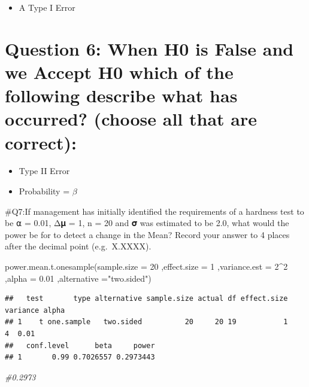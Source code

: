 \documentclass[
]{article}
\newenvironment{Shaded}{\begin{snugshade}}{\end{snugshade}}
\newcommand{\AttributeTok}[1]{\textcolor[rgb]{0.77,0.63,0.00}{#1}}
\newcommand{\CommentTok}[1]{\textcolor[rgb]{0.56,0.35,0.01}{\textit{#1}}}
\newcommand{\DecValTok}[1]{\textcolor[rgb]{0.00,0.00,0.81}{#1}}
\newcommand{\FloatTok}[1]{\textcolor[rgb]{0.00,0.00,0.81}{#1}}
\newcommand{\FunctionTok}[1]{\textcolor[rgb]{0.00,0.00,0.00}{#1}}
\newcommand{\NormalTok}[1]{#1}
\newcommand{\SpecialCharTok}[1]{\textcolor[rgb]{0.00,0.00,0.00}{#1}}
\newcommand{\StringTok}[1]{\textcolor[rgb]{0.31,0.60,0.02}{#1}}
\providecommand{\tightlist}{%
  \setlength{\itemsep}{0pt}\setlength{\parskip}{0pt}}
\begin{document}
\begin{itemize}
\tightlist
\item
  A Type I Error
\end{itemize}

\hypertarget{question-6-when-h0-is-false-and-we-accept-h0-which-of-the-following-describe-what-has-occurred-choose-all-that-are-correct}{%
\section{Question 6: When H0 is False and we Accept H0 which of the
following describe what has occurred? (choose all that are
correct):}\label{question-6-when-h0-is-false-and-we-accept-h0-which-of-the-following-describe-what-has-occurred-choose-all-that-are-correct}}

\begin{itemize}
\tightlist
\item
  Type II Error
\item
  Probability = \(\beta\)
\end{itemize}

\#Q7:If management has initially identified the requirements of a
hardness test to be ⍺ = 0.01, Δ𝛍 = 1, n = 20 and 𝛔 was estimated to be
2.0, what would the power be for to detect a change in the Mean? Record
your answer to 4 places after the decimal point (e.g.~X.XXXX).

\begin{Shaded}
\begin{Highlighting}[]
\FunctionTok{power.mean.t.onesample}\NormalTok{(}\AttributeTok{sample.size =} \DecValTok{20}
\NormalTok{                       ,}\AttributeTok{effect.size =} \DecValTok{1}
\NormalTok{                       ,}\AttributeTok{variance.est =} \DecValTok{2}\SpecialCharTok{\^{}}\DecValTok{2}
\NormalTok{                       ,}\AttributeTok{alpha =} \FloatTok{0.01}
\NormalTok{                       ,}\AttributeTok{alternative =}\StringTok{"two.sided"}\NormalTok{)}
\end{Highlighting}
\end{Shaded}

\begin{verbatim}
##   test       type alternative sample.size actual df effect.size variance alpha
## 1    t one.sample   two.sided          20     20 19           1        4  0.01
##   conf.level      beta     power
## 1       0.99 0.7026557 0.2973443
\end{verbatim}

\begin{Shaded}
\begin{Highlighting}[]
\CommentTok{\#0.2973}
\end{Highlighting}
\end{Shaded}
\end{document}
